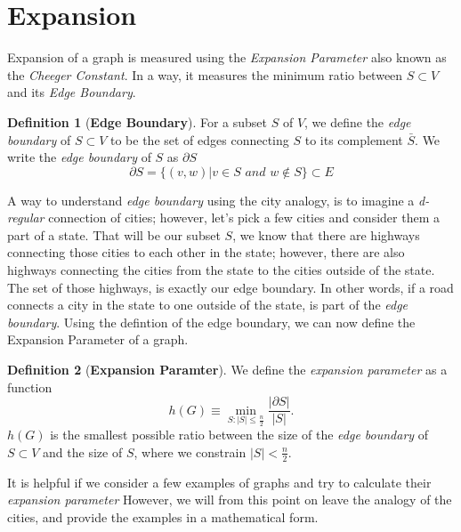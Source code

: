 \documentclass{article}
\theoremstyle{theorem}
\theoremstyle{definition}
\newtheorem{definition}{Definition}[section]
\theoremstyle{example}
\theoremstyle{proposition}
\begin{document}
    \section{Expansion}
        Expansion of a graph is measured using the \textit{Expansion Parameter} also known as the \textit{Cheeger Constant}. In a way, it measures the minimum ratio between $S \subset V$ and its \textit{Edge Boundary}.
    \begin{definition}[\textbf{Edge Boundary}]
        For a subset $S$ of $V$, we define the \textit{edge boundary} of $S \subset V$ to be the set of edges connecting $S$ to its complement $\bar{S}$. We write the \textit{edge boundary} of $S$ as $\partial{S}$
        $$\partial{S} = \{(v,w) | v \in S \textit{ and }  w \not\in S\} \subset E$$
    \end{definition}
        A way to understand \textit{edge boundary} using the city analogy, is to imagine a \textit{d-regular} connection of cities; however, let's pick a few cities and consider them a part of a state. That will be our subset $S$, we know that there are highways connecting those cities to each other in the state; however, there are also highways connecting the cities from the state to the cities outside of the state. The set of those highways, is exactly our edge boundary. In other words, if a road connects a city in the state to one outside of the state, is part of the \textit{edge boundary}.
        Using the defintion of the edge boundary, we can now define the Expansion Parameter of a graph.
        \begin{definition}[\textbf{Expansion Paramter}]
            We define the \textit{expansion parameter} as a  function
            \[h(G) \equiv \min\limits_{S:|S| \leq \frac{n}{2}} \frac{|\partial{S}|}{|S|}\textrm{.}\]
            $h(G)$ is the smallest possible ratio between the size of the \textit{edge boundary} of $S \subset V$ and the size of $S$, where we constrain $|S| < \frac{n}{2}$.
        \end{definition}
        It is helpful if we consider a few examples of graphs and try to calculate their \textit{expansion parameter} However, we will from this point on leave the analogy of the cities, and provide the examples in a mathematical form.
        \newpage
\end{document}
